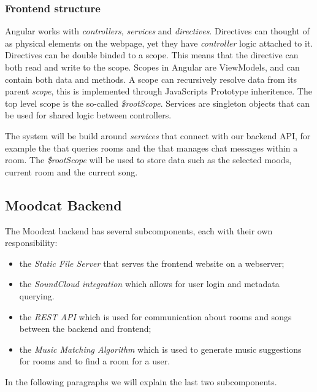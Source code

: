 \label{frontendstructure}
\subsubsection{Frontend structure}
Angular works with \textit{controllers}, \textit{services} and \textit{directives}.
Directives can thought of as physical elements on the webpage, yet they have \textit{controller} logic attached to it.
Directives can be double binded to a scope. This means that the directive can both read and write to the scope.
Scopes in Angular are \glspl{ViewModel}, and can contain both data and methods.
A scope can recursively resolve data from its parent \textit{scope}, this is implemented through JavaScripts \gls{Prototype inheritence}.
The top level scope is the so-called \textit{\$rootScope}.
Services are singleton objects that can be used for shared logic between controllers.

\par
The system will be build around \textit{services} that connect with our backend API, for example the  that queries rooms and the  that manages chat messages within a room.
The \textit{\$rootScope} will be used to store data such as the selected moods, current room and the current song.

\subsection{Moodcat Backend}
The Moodcat backend has several subcomponents, each with their own responsibility:
\begin{itemize}
\item the \textit{Static File Server} that serves the frontend website on a webserver;
\item the \textit{SoundCloud integration} which allows for user login and metadata querying.
\item the \textit{REST API} which is used for communication about rooms and songs between the backend and frontend;
\item the \textit{Music Matching Algorithm} which is used to generate music suggestions for rooms and to find a room for a user.
\end{itemize}
In the following paragraphs we will explain the last two subcomponents.

